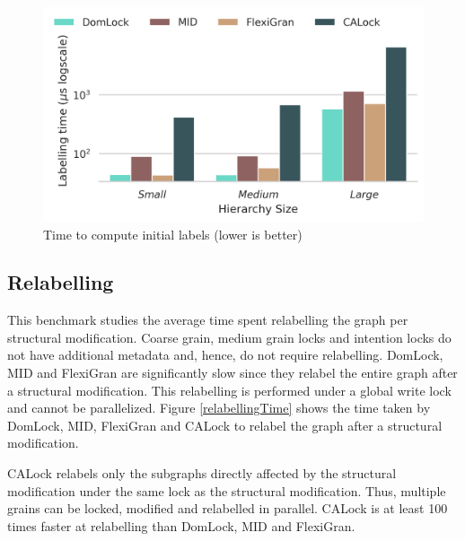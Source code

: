 \begin{figure}
	\centering
	\captionsetup{justification=centering}
	\includegraphics[width=.7\columnwidth]{figures/PerformanceCharts/InitialLabelling}
	\caption{Time to compute initial labels (lower is better)}
	\label{initialLabelling}
\end{figure}


\subsection{Relabelling}
This benchmark studies the average time spent relabelling the graph per structural modification. Coarse grain, medium grain locks and intention locks do not have additional metadata and, hence, do not require relabelling. 
DomLock, MID and FlexiGran are significantly slow since they relabel the entire graph after a structural modification. This relabelling is performed under a global write lock and cannot be parallelized. Figure \ref{relabellingTime} shows the time taken by DomLock, MID, FlexiGran and CALock to relabel the graph after a structural modification.





CALock relabels only the subgraphs directly affected by the structural modification under the same lock as the structural modification.
Thus, multiple grains can be locked, modified and relabelled in parallel. CALock is at least 100 times faster at relabelling than DomLock, MID and FlexiGran.

